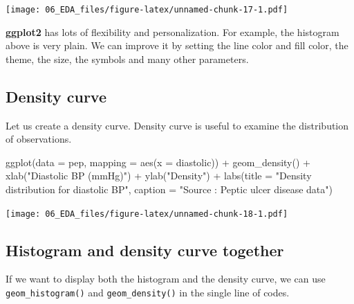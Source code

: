 \documentclass[
  10pt,
]{krantz}
\newenvironment{Shaded}{\begin{snugshade}}{\end{snugshade}}
\newcommand{\AttributeTok}[1]{\textcolor[rgb]{0.77,0.63,0.00}{#1}}
\newcommand{\FunctionTok}[1]{\textcolor[rgb]{0.00,0.00,0.00}{#1}}
\newcommand{\NormalTok}[1]{#1}
\newcommand{\SpecialCharTok}[1]{\textcolor[rgb]{0.00,0.00,0.00}{#1}}
\newcommand{\StringTok}[1]{\textcolor[rgb]{0.31,0.60,0.02}{#1}}
\begin{document}
\texttt{[image: 06\_EDA\_files/figure-latex/unnamed-chunk-17-1.pdf]}

\textbf{ggplot2} has lots of flexibility and personalization. For example, the histogram above is very plain. We can improve it by setting the line color and fill color, the theme, the size, the symbols and many other parameters.

\hypertarget{density-curve}{%
\subsection{\texorpdfstring{Density curve}{Density curve}}\label{density-curve}}

Let us create a density curve. Density curve is useful to examine the distribution of observations.

\begin{Shaded}
\begin{Highlighting}[]
\FunctionTok{ggplot}\NormalTok{(}\AttributeTok{data =}\NormalTok{ pep, }\AttributeTok{mapping =} \FunctionTok{aes}\NormalTok{(}\AttributeTok{x =}\NormalTok{ diastolic)) }\SpecialCharTok{+} 
  \FunctionTok{geom\_density}\NormalTok{() }\SpecialCharTok{+}
  \FunctionTok{xlab}\NormalTok{(}\StringTok{"Diastolic BP (mmHg)"}\NormalTok{) }\SpecialCharTok{+}
  \FunctionTok{ylab}\NormalTok{(}\StringTok{"Density"}\NormalTok{) }\SpecialCharTok{+}
  \FunctionTok{labs}\NormalTok{(}\AttributeTok{title =} \StringTok{"Density distribution for diastolic BP"}\NormalTok{,}
       \AttributeTok{caption =} \StringTok{"Source : Peptic ulcer disease data"}\NormalTok{)}
\end{Highlighting}
\end{Shaded}

\texttt{[image: 06\_EDA\_files/figure-latex/unnamed-chunk-18-1.pdf]}

\hypertarget{histogram-and-density-curve-together}{%
\subsection{\texorpdfstring{Histogram and density curve together}{Histogram and density curve together}}\label{histogram-and-density-curve-together}}

If we want to display both the histogram and the density curve, we can use \texttt{geom\_histogram()} and \texttt{geom\_density()} in the single line of codes.
\end{document}
